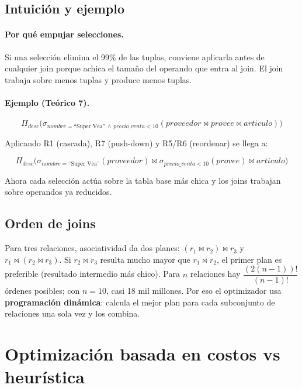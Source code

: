 \documentclass[11pt,a4paper]{article}
\newcommand{\sel}[1]{\sigma_{#1}}
\newcommand{\proy}[1]{\Pi_{#1}}
\newcommand{\jn}{\bowtie}
\begin{document}
\subsection{Intuición y ejemplo}

\paragraph{Por qué empujar selecciones.} Si una selección elimina el 99\%
de las tuplas, conviene aplicarla antes de cualquier join porque achica el
tamaño del operando que entra al join. El join trabaja sobre menos tuplas
y produce menos tuplas.

\paragraph{Ejemplo (Teórico 7).}

\[
\proy{desc}\!\big(\sel{nombre=\text{``Super Vea''}\,\wedge\,precio\_venta<10}
(proveedor \jn provee \jn articulo)\big)
\]

Aplicando R1 (cascada), R7 (push-down) y R5/R6 (reordenar) se llega a:

\[
\proy{desc}\!\big( \sel{nombre=\text{``Super Vea''}}(proveedor) \jn
\sel{precio\_venta<10}(provee) \jn articulo \big)
\]

Ahora cada selección actúa sobre la tabla base más chica y los joins
trabajan sobre operandos ya reducidos.

\subsection{Orden de joins}

Para tres relaciones, asociatividad da dos planes:
$(r_1\jn r_2)\jn r_3$ y $r_1\jn(r_2\jn r_3)$. Si $r_2\jn r_3$ resulta
mucho mayor que $r_1\jn r_2$, el primer plan es preferible (resultado
intermedio más chico). Para $n$ relaciones hay
$\dfrac{(2(n-1))!}{(n-1)!}$ órdenes posibles; con $n=10$, casi 18 mil
millones. Por eso el optimizador usa \textbf{programación dinámica}: calcula
el mejor plan para cada subconjunto de relaciones una sola vez y los
combina.

\section{Optimización basada en costos vs heurística}
\end{document}
